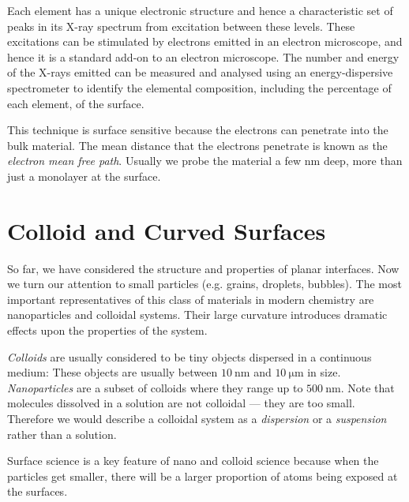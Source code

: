 \documentclass{article}
\theoremstyle{plain}\theoremheaderfont{\normalfont\itshape}\theorembodyfont{\rmfamily}\theoremseparator{.}\newtheorem*{rem}{Remark}\newtheorem*{ex}{Example}\newtheorem*{proof}{Proof}\newtheorem*{altp}{Alternative proof}
\theoremstyle{plain}\theoremheaderfont{\normalfont\bfseries}\theorembodyfont{\rmfamily}\theoremseparator{.}\newtheorem{thm}{Theorem}[section]\newtheorem{lem}[thm]{Lemma}\newtheorem{prop}[thm]{Proposition}\newtheorem*{cor}{Corollary}\newtheorem{defn}[thm]{Definition}\newtheorem{clm}[thm]{Claim}\newtheorem{clminproof}{Claim}\newtheorem*{law}{Law}\newtheorem{pos}[thm]{Postulate}
\theoremstyle{break}\theoremheaderfont{\normalfont\itshape}\theorembodyfont{\rmfamily}\theoremseparator{.\medskip}\newtheorem*{proofskip}{Proof}\newtheorem*{exs}{Examples}\newtheorem*{rems}{Remarks}
\theoremstyle{break}\theoremheaderfont{\normalfont\bfseries}\theorembodyfont{\rmfamily}\theoremseparator{.\medskip}\newtheorem{lemskip}[thm]{Lemma}\newtheorem{defnskip}[thm]{Definition}\newtheorem{propskip}[thm]{Proposition}\newtheorem{thmskip}[thm]{Theorem}
\numberwithin{equation}{section}
\newcommand{\unit}[1]{\ \mathrm{#1}}
\begin{document}
	Each element has a unique electronic structure and hence a characteristic set of peaks in its X-ray spectrum from excitation between these levels. These excitations can be stimulated by electrons emitted in an electron microscope, and hence it is a standard add-on to an electron microscope. The number and energy of the X-rays emitted can be measured and analysed using an energy-dispersive spectrometer to identify the elemental composition, including the percentage of each element, of the surface.

	This technique is surface sensitive because the electrons can penetrate into the bulk material. The mean distance that the electrons penetrate is known as the \textit{electron mean free path}. Usually we probe the material a few \(\mathrm{nm}\) deep, more than just a monolayer at the surface.

	\newpage
	\section{Colloid and Curved Surfaces}
	So far, we have considered the structure and properties of planar interfaces. Now we turn our attention to small particles (e.g. grains, droplets, bubbles). The most important representatives of this class of materials in modern chemistry are nanoparticles and colloidal systems. Their large curvature introduces dramatic effects upon the properties of the system.

	\textit{Colloids} are usually considered to be tiny objects dispersed in a continuous medium: These objects are usually between \(10\unit{nm}\) and \(10\unit{\mu m}\) in size. \textit{Nanoparticles} are a subset of colloids where they range up to \(500\unit{nm}\). Note that molecules dissolved in a solution are not colloidal --- they are too small. Therefore we would describe a colloidal system as a \textit{dispersion} or a \textit{suspension} rather than a solution.

	Surface science is a key feature of nano and colloid science because when the particles get smaller, there will be a larger proportion of atoms being exposed at the surfaces.
\end{document}
